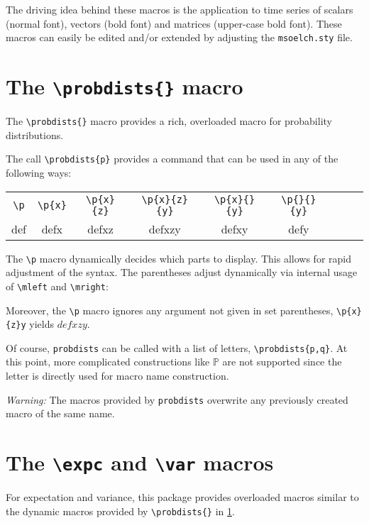 \documentclass
[
twoside, %
]
{article}
\newcommand{\p}{def}
\begin{document}
The driving idea behind these macros is the application to time series of scalars (normal font), vectors (bold font) and matrices (upper-case bold font). These macros can easily be edited and/or extended by adjusting the \texttt{msoelch.sty} file.

\section{The \texttt{\textbackslash probdists\{\}} macro}\label{sec:probdists}
The \texttt{\textbackslash probdists\{\}} macro provides a rich, overloaded macro for probability distributions.

The call \texttt{\textbackslash probdists\{p\}} provides a command that can be used in any of the following ways:

\begin{table}[hb]
	\centering
	\begin{tabular}{ccccccccc}
		\texttt{\textbackslash p}& \texttt{\textbackslash p\{x\}} & \texttt{\textbackslash p\{x\}\{z\}} &\texttt{\textbackslash p\{x\}\{z\}\{y\}} &\texttt{\textbackslash p\{x\}\{\}\{y\}} & \texttt{\textbackslash p\{\}\{\}\{y\}}\\
		\p & \p{x} & \p{x}{z} & \p{x}{z}{y} & \p{x}{}{y} & \p{}{}{y}
	\end{tabular}
\end{table}
The \texttt{\textbackslash p} macro dynamically decides which parts to display. This allows for rapid adjustment of the syntax. The parentheses adjust dynamically via internal usage of \texttt{\textbackslash mleft} and \texttt{\textbackslash mright}:
\eq{\p{\frac{x}{y}}}

Moreover, the \texttt{\textbackslash p} macro ignores any argument not given in set parentheses, \eg \texttt{\textbackslash p\{x\}\{z\}y} yields $\p{x}{z}y$.

Of course, \texttt{probdists} can be called with a list of letters, \eg \texttt{\textbackslash probdists\{p,q\}}.  At this point, more complicated constructions like $\mathbb{P}$ \etc are not supported since the letter is directly used for macro name construction.

\emph{Warning:} The macros provided by \texttt{probdists} overwrite any previously created macro of the same name.

\section{The \texttt{\textbackslash expc} and \texttt{\textbackslash var} macros}
For expectation and variance, this package provides overloaded macros similar to the dynamic macros provided by \texttt{\textbackslash probdists\{\}} in \cref{sec:probdists}.
\end{document}
